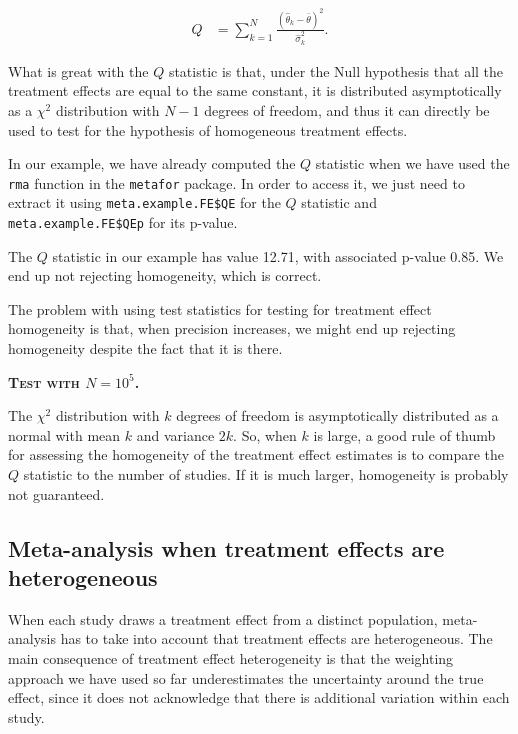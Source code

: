 \documentclass[]{book}
\theoremstyle{definition}
\theoremstyle{definition}
\theoremstyle{definition}
\theoremstyle{remark}
\let\BeginKnitrBlock\begin \let\EndKnitrBlock\end
\begin{document}
\begin{align*}
  Q & = \sum_{k=1}^N\frac{(\hat{\theta}_k-\bar{\theta})^2}{\hat{\sigma}^2_k}.
\end{align*}

What is great with the \(Q\) statistic is that, under the Null
hypothesis that all the treatment effects are equal to the same
constant, it is distributed asymptotically as a \(\chi^2\) distribution
with \(N-1\) degrees of freedom, and thus it can directly be used to
test for the hypothesis of homogeneous treatment effects.

\BeginKnitrBlock{example}
\protect\hypertarget{exm:unnamed-chunk-148}{}{\label{exm:unnamed-chunk-148}
}In our example, we have already computed the \(Q\) statistic when we
have used the \texttt{rma} function in the \texttt{metafor} package. In
order to access it, we just need to extract it using
\texttt{meta.example.FE\$QE} for the \(Q\) statistic and
\texttt{meta.example.FE\$QEp} for its p-value.
\EndKnitrBlock{example} The \(Q\) statistic in our example has value
12.71, with associated p-value 0.85. We end up not rejecting
homogeneity, which is correct.

\BeginKnitrBlock{remark}
\iffalse{} {Remark. } \fi{}The problem with using test statistics for
testing for treatment effect homogeneity is that, when precision
increases, we might end up rejecting homogeneity despite the fact that
it is there.
\EndKnitrBlock{remark}

\textbf{\textsc{Test with \(N=10^5\).}}

\BeginKnitrBlock{remark}
\iffalse{} {Remark. } \fi{}The \(\chi^2\) distribution with \(k\)
degrees of freedom is asymptotically distributed as a normal with mean
\(k\) and variance \(2k\). So, when \(k\) is large, a good rule of thumb
for assessing the homogeneity of the treatment effect estimates is to
compare the \(Q\) statistic to the number of studies. If it is much
larger, homogeneity is probably not guaranteed.
\EndKnitrBlock{remark}

\subsection{Meta-analysis when treatment effects are
heterogeneous}\label{meta-analysis-when-treatment-effects-are-heterogeneous}

When each study draws a treatment effect from a distinct population,
meta-analysis has to take into account that treatment effects are
heterogeneous. The main consequence of treatment effect heterogeneity is
that the weighting approach we have used so far underestimates the
uncertainty around the true effect, since it does not acknowledge that
there is additional variation within each study.
\end{document}
